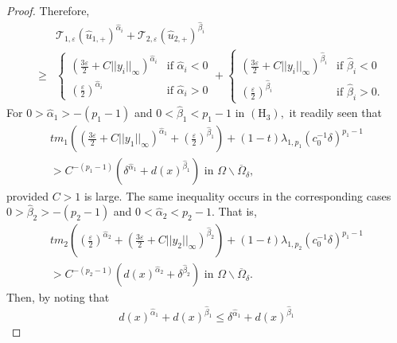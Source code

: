 \documentclass[11pt]{amsart}
\theoremstyle{definition}
\theoremstyle{remark}
\numberwithin{equation}{section}
\begin{document}
\begin{proof}
Therefore, 
\begin{eqnarray*}
&&\mathcal{T}_{1,\varepsilon }(\hat{u}_{1,+})^{\hat{\alpha}_{i}}+\mathcal{T}
_{2,\varepsilon }(\hat{u}_{2,+})^{\hat{\beta}_{i}} \\
&\geq &\left\{ 
\begin{array}{ll}
(\frac{3\varepsilon }{2}+C||y_{i}||_{\infty })^{\hat{\alpha}_{i}} & \text{if 
}\hat{\alpha}_{i}<0 \\ 
(\frac{\varepsilon }{2})^{\hat{\alpha}_{i}} & \text{if }\hat{\alpha}_{i}>0%
\end{array}
\right. +\left\{ 
\begin{array}{ll}
(\frac{3\varepsilon }{2}+C||y_{i}||_{\infty })^{\hat{\beta}_{i}} & \text{if }
\hat{\beta}_{i}<0 \\ 
(\frac{\varepsilon }{2})^{\hat{\beta}_{i}} & \text{if }\hat{\beta}_{i}>0.%
\end{array}
\right.
\end{eqnarray*}
For $0>\hat{\alpha}_{1}>-(p_{1}-1)$ and $0<\hat{\beta}_{1}<p_{1}-1$ in $( 
\mathrm{H}_{3}),$ it readily seen that 
\begin{equation}
\begin{array}{c}
tm_{1}((\frac{3\varepsilon }{2}+C||y_{1}||_{\infty })^{\hat{\alpha}_{1}}+( 
\frac{\varepsilon }{2})^{\hat{\beta}_{1}})+(1-t)\lambda
_{1,p_{1}}(c_{0}^{-1}\delta )^{p_{1}-1} \\ 
>C^{-(p_{1}-1)}(\delta ^{\hat{\alpha}_{1}}+d(x)^{\hat{\beta}_{1}})\text{ in }
\Omega \backslash \overline{\Omega }_{\delta },%
\end{array}
\label{27}
\end{equation}
provided $C>1$ is large. The same inequality occurs in the corresponding
cases $0>\hat{\beta}_{2}>-(p_{2}-1)$ and $0<\hat{\alpha}_{2}<p_{2}-1.$ That
is, 
\begin{equation}
\begin{array}{c}
tm_{2}((\frac{\varepsilon }{2})^{\hat{\alpha}_{2}}+(\frac{3\varepsilon }{2}
+C||y_{2}||_{\infty })^{\hat{\beta}_{2}})+(1-t)\lambda
_{1,p_{2}}(c_{0}^{-1}\delta )^{p_{1}-1} \\ 
>C^{-(p_{2}-1)}(d(x)^{\hat{\alpha}_{2}}+\delta ^{\hat{\beta}_{2}})\text{ in }
\Omega \backslash \overline{\Omega }_{\delta }.%
\end{array}
\label{28}
\end{equation}
Then, by noting that 
\begin{equation}
d(x)^{\hat{\alpha}_{1}}+d(x)^{\hat{\beta}_{1}}\leq \delta ^{\hat{\alpha}
_{1}}+d(x)^{\hat{\beta}_{1}}  \label{29}

\end{equation}
\end{proof}
\end{document}

